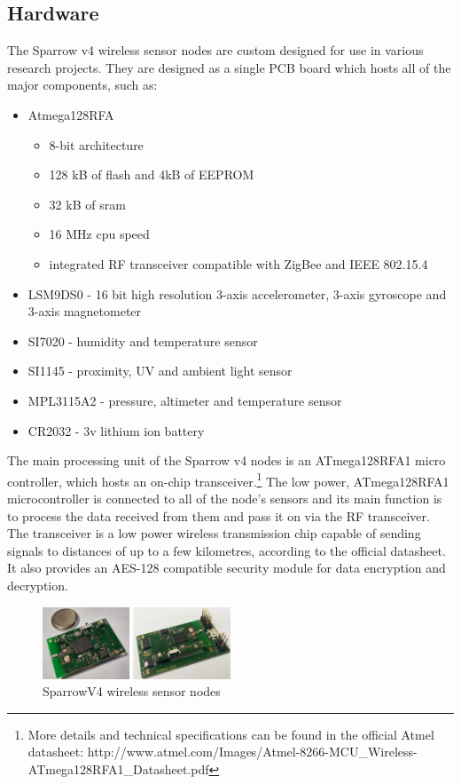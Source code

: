 \subsection{Hardware}

The Sparrow v4 wireless sensor nodes are custom designed for use in various research projects.
They are designed as a single PCB board which hosts all of the major components, such as:
\begin{itemize}
    \item Atmega128RFA
        \begin{itemize}
            \item 8-bit architecture
            \item 128 kB of flash and 4kB of EEPROM
            \item 32 kB of sram
            \item 16 MHz cpu speed
            \item integrated RF transceiver compatible with ZigBee and IEEE 802.15.4
        \end{itemize}
    \item LSM9DS0 - 16 bit high resolution 3-axis accelerometer, 3-axis gyroscope and 3-axis magnetometer
    \item SI7020 - humidity and temperature sensor
    \item SI1145 - proximity, UV and ambient light sensor
    \item MPL3115A2 - pressure, altimeter and temperature sensor
    \item CR2032 - 3v lithium ion battery
\end{itemize}

The main processing unit of the Sparrow v4 nodes is an ATmega128RFA1 micro controller, 
which hosts an on-chip transceiver.\footnote{More details and technical specifications can be found in the official Atmel datasheet: http://www.atmel.com/Images/Atmel-8266-MCU_Wireless-ATmega128RFA1_Datasheet.pdf} 
The low power, ATmega128RFA1 microcontroller is connected to all of the node's sensors and its
main function is to process the data received from them and pass it on via the RF transceiver. The transceiver 
is a low power wireless transmission chip capable of sending signals to distances of up to a few kilometres, according 
to the official datasheet. It also provides an AES-128 compatible security module for data encryption and decryption.

\begin{figure}[ht] \centering
  \includegraphics[width=0.5\textwidth]{img/sparrow-v4.png}
  \caption{SparrowV4 wireless sensor nodes}
\end{figure}


